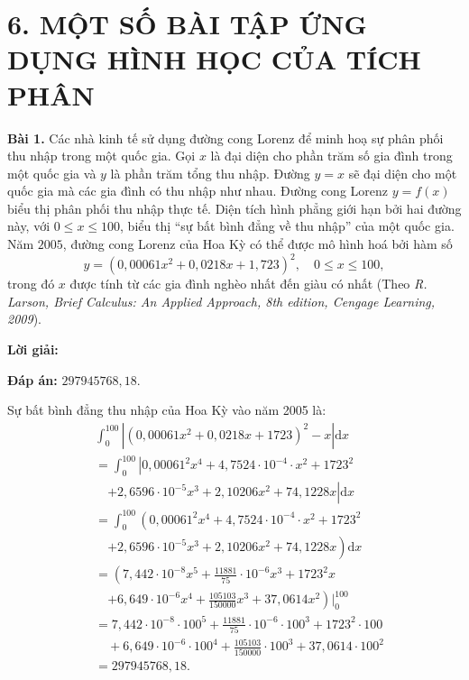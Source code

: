 \section*{6. MỘT SỐ BÀI TẬP ỨNG DỤNG HÌNH HỌC CỦA TÍCH PHÂN}

\noindent\textbf{Bài 1.} Các nhà kinh tế sử dụng đường cong Lorenz để minh hoạ sự phân phối thu nhập trong một quốc gia. Gọi $x$ là đại diện cho phần trăm số gia đình trong một quốc gia và $y$ là phần trăm tổng thu nhập. Đường $y = x$ sẽ đại diện cho một quốc gia mà các gia đình có thu nhập như nhau. Đường cong Lorenz $y = f(x)$ biểu thị phân phối thu nhập thực tế. Diện tích hình phẳng giới hạn bởi hai đường này, với $0 \le x \le 100$, biểu thị ``sự bất bình đẳng về thu nhập'' của một quốc gia. Năm $2005$, đường cong Lorenz của Hoa Kỳ có thể được mô hình hoá bởi hàm số
\[
y = \left(0{,}00061x^2 + 0{,}0218x + 1{,}723\right)^2, \quad 0 \le x \le 100,
\]
trong đó $x$ được tính từ các gia đình nghèo nhất đến giàu có nhất (Theo \textit{R. Larson, Brief Calculus: An Applied Approach, 8th edition, Cengage Learning, 2009}).

\noindent\textbf{Lời giải:}

\noindent\textbf{Đáp án:} $297945768{,}18$.

\noindent Sự bất bình đẳng thu nhập của Hoa Kỳ vào năm 2005 là:
\begin{align*}
    &\int_{0}^{100} \left| \left(0{,}00061x^2 + 0{,}0218x + 1723\right)^2 - x \right| \mathrm{d}x \\
    &= \int_{0}^{100} \left| 0{,}00061^2x^4 + 4{,}7524 \cdot 10^{-4} \cdot x^2 + 1723^2 \right. \\
    &\quad \left. + 2{,}6596 \cdot 10^{-5}x^3 + 2{,}10206x^2 + 74{,}1228x \right| \mathrm{d}x \\
    &= \int_{0}^{100} \left( 0{,}00061^2x^4 + 4{,}7524 \cdot 10^{-4} \cdot x^2 + 1723^2 \right. \\
    &\quad \left. + 2{,}6596 \cdot 10^{-5}x^3 + 2{,}10206x^2 + 74{,}1228x \right) \mathrm{d}x \\
    &= \left( 7{,}442 \cdot 10^{-8}x^5 + \frac{11881}{75} \cdot 10^{-6}x^3 + 1723^2x \right. \\
    &\quad \left. + 6{,}649 \cdot 10^{-6}x^4 + \frac{105103}{150000}x^3 + 37{,}0614x^2 \right)\Bigg|_{0}^{100} \\
    &= 7{,}442 \cdot 10^{-8} \cdot 100^5 + \frac{11881}{75} \cdot 10^{-6} \cdot 100^3 + 1723^2 \cdot 100 \\
    &\quad + 6{,}649 \cdot 10^{-6} \cdot 100^4 + \frac{105103}{150000} \cdot 100^3 + 37{,}0614 \cdot 100^2 \\
    &= 297945768{,}18.
\end{align*}

